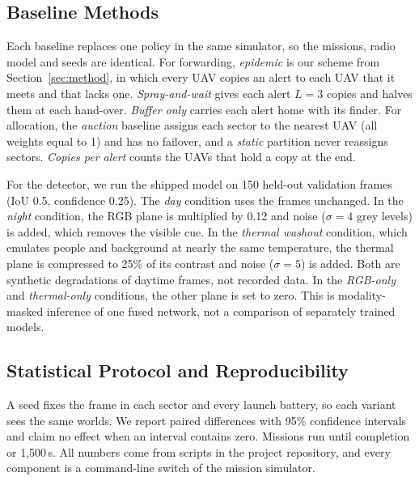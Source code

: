 \documentclass[conference]{IEEEtran}
\begin{document}
\subsection{Baseline Methods}
Each baseline replaces one policy in the same simulator, so the missions, radio model and seeds are identical. For forwarding, \emph{epidemic} is our scheme from Section~\ref{sec:method}, in which every UAV copies an alert to each UAV that it meets and that lacks one. \emph{Spray-and-wait} \cite{spyropoulos2005spray} gives each alert $L=3$ copies and halves them at each hand-over. \emph{Buffer only} carries each alert home with its finder. For allocation, the \emph{auction} baseline assigns each sector to the nearest UAV (all weights equal to 1) and has no failover, and a \emph{static} partition never reassigns sectors. \emph{Copies per alert} counts the UAVs that hold a copy at the end.

For the detector, we run the shipped model on 150 held-out validation frames (IoU 0.5, confidence 0.25). The \emph{day} condition uses the frames unchanged. In the \emph{night} condition, the RGB plane is multiplied by 0.12 and noise ($\sigma=4$ grey levels) is added, which removes the visible cue. In the \emph{thermal washout} condition, which emulates people and background at nearly the same temperature, the thermal plane is compressed to 25\% of its contrast and noise ($\sigma=5$) is added. Both are synthetic degradations of daytime frames, not recorded data. In the \emph{RGB-only} and \emph{thermal-only} conditions, the other plane is set to zero. This is modality-masked inference of one fused network, not a comparison of separately trained models.

\subsection{Statistical Protocol and Reproducibility}
A seed fixes the frame in each sector and every launch battery, so each variant sees the same worlds. We report paired differences with 95\% confidence intervals and claim no effect when an interval contains zero. Missions run until completion or 1{,}500\,s. All numbers come from scripts in the project repository, and every component is a command-line switch of the mission simulator.
\end{document}

